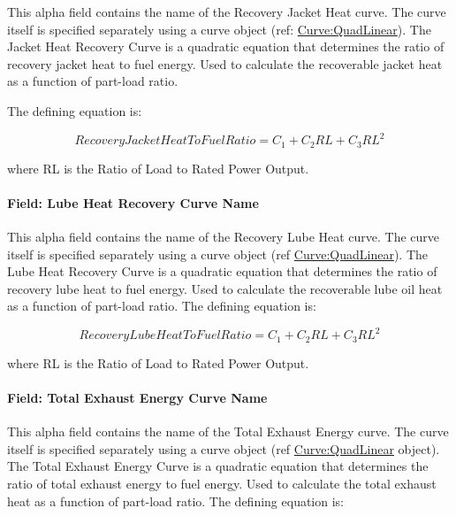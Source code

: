 This alpha field contains the name of the Recovery Jacket Heat curve. The curve itself is specified separately using a curve object (ref: \hyperref[curvequadlinear]{Curve:QuadLinear}). The Jacket Heat Recovery Curve is a quadratic equation that determines the ratio of recovery jacket heat to fuel energy. Used to calculate the recoverable jacket heat as a function of part-load ratio.

The defining equation is:

\begin{equation}
RecoveryJacketHeatToFuelRatio = {C_1} + {C_2}RL + {C_3}R{L^2}
\end{equation}

where RL is the Ratio of Load to Rated Power Output.

\paragraph{Field: Lube Heat Recovery Curve Name}\label{field-lube-heat-recovery-curve-name}

This alpha field contains the name of the Recovery Lube Heat curve. The curve itself is specified separately using a curve object (ref \hyperref[curvequadlinear]{Curve:QuadLinear}). The Lube Heat Recovery Curve is a quadratic equation that determines the ratio of recovery lube heat to fuel energy. Used to calculate the recoverable lube oil heat as a function of part-load ratio. The defining equation is:

\begin{equation}
RecoveryLubeHeatToFuelRatio = {C_1} + {C_2}RL + {C_3}R{L^2}
\end{equation}

where RL is the Ratio of Load to Rated Power Output.

\paragraph{Field: Total Exhaust Energy Curve Name}\label{field-total-exhaust-energy-curve-name}

This alpha field contains the name of the Total Exhaust Energy curve. The curve itself is specified separately using a curve object (ref \hyperref[curvequadlinear]{Curve:QuadLinear} object). The Total Exhaust Energy Curve is a quadratic equation that determines the ratio of total exhaust energy to fuel energy. Used to calculate the total exhaust heat as a function of part-load ratio. The defining equation is:

